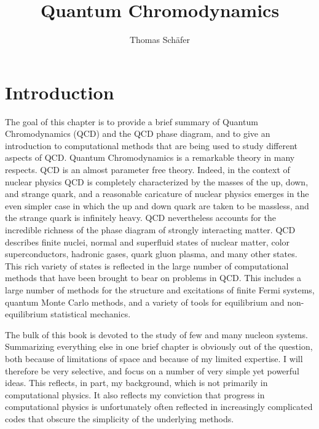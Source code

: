 \title{Quantum Chromodynamics}
\author{Thomas Sch\"afer}

\maketitle
{}



\section{Introduction}

 The goal of this chapter is to provide a brief summary of Quantum 
Chromodynamics (QCD) and the QCD phase diagram, and to give an introduction 
to computational methods that are being used to study different aspects of 
QCD. Quantum Chromodynamics is a remarkable theory in many respects. QCD 
is an almost parameter free theory. Indeed, in the context of nuclear 
physics QCD is completely characterized by the masses of the up, down,
and strange quark, and a reasonable caricature of nuclear physics emerges
in the even simpler case in which the up and down quark are taken to
be massless, and the strange quark is infinitely heavy. QCD nevertheless
accounts for the incredible richness of the phase diagram of strongly 
interacting matter. QCD describes finite nuclei, normal and superfluid 
states of nuclear matter, color superconductors, hadronic gases, quark 
gluon plasma, and many other states. This rich variety of states is
reflected in the large number of computational methods that have been 
brought to bear on problems in QCD. This includes a large number 
of methods for the structure and excitations of finite Fermi systems, 
quantum Monte Carlo methods, and a variety of tools for equilibrium
and non-equilibrium statistical mechanics. 

 The bulk of this book is devoted to the study of few and many nucleon
systems. Summarizing everything else in one brief chapter is obviously
out of the question, both because of limitations of space and because
of my limited expertise. I will therefore be very selective, and focus 
on a number of very simple yet powerful ideas. This reflects, in part, 
my background, which is not primarily in computational physics. It 
also reflects my conviction that progress in computational physics is 
unfortunately often reflected in increasingly complicated codes that 
obscure the simplicity of the underlying methods. 

